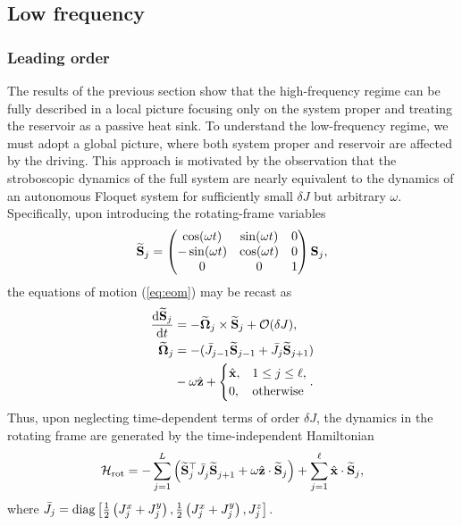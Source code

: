\documentclass[aps,pre,twocolumn,notitlepage,floats,10pt]{revtex4-1}
\def\d{\mathrm{d}}
\def\ptop{{\vphantom\top}}
\newcommand{\be}{\begin{equation}}
\newcommand{\ee}{\end{equation}}
\newcommand{\beA}{\begin{equation}\begin{aligned}}
\newcommand{\eeA}{\end{aligned}\end{equation}}
\begin{document}
\subsection{Low frequency} \label{sec:low-freq}


\subsubsection{Leading order}

The results of the previous section show that the high-frequency regime can be
fully described in a local picture focusing only on the system proper and
treating the reservoir as a passive heat sink.
To understand the low-frequency regime, we must adopt a global picture, where
both system proper and reservoir are affected by the driving.  This approach is
motivated by the observation that the stroboscopic dynamics of the full system
are nearly equivalent to the dynamics of an autonomous Floquet system for
sufficiently small $\delta J$ but arbitrary $\omega$.
Specifically, upon introducing the rotating-frame variables
\be
\widetilde{\bf S}_j = \begin{pmatrix} \cos (\omega t) & \sin (\omega t) & 0 \\ -\sin (\omega t) & \cos (\omega t) & 0 \\ 0 & 0 & 1 \end{pmatrix} {\bf S}_j,
\ee
the equations of motion (\ref{eq:eom}) may be recast as
\beA
\frac{\d \widetilde{\bf S}_j}{\d t} &= -\widetilde{\boldsymbol\Omega}_j \times \widetilde{\bf S}_j + \mathcal{O}(\delta J),\\
\widetilde{\boldsymbol\Omega}_j &= -(\bar{J}_{j-1}\widetilde{\bf S}_{j-1} + \bar{J}_j\widetilde{\bf S}_{j+1})\\
& - \omega \hat{\bf z} + \begin{cases} \hat{\bf x},& 1\leq j \leq \ell,\\ 0,& {\rm otherwise} \end{cases}.
\label{eq:rotdrop}
\eeA
Thus, upon neglecting time-dependent terms of order $\delta J$, the dynamics in
the rotating frame are generated by the time-independent Hamiltonian
\be
\mathcal{H}_{\rm rot} = - \sum_{j=1}^{L} \left( \widetilde{\bf S}_j^\top \bar{J}_j^\ptop \widetilde{\bf S}_{j+1}^\ptop +\omega \hat{\bf z} \cdot \widetilde{\bf S}_j \right) + \sum_{j=1}^\ell \hat{\bf x} \cdot \widetilde{\bf S}_j,
\label{eq:Hrot-L}
\ee
where $\bar{J}_j = {\rm diag}\left[ \frac{1}{2} \left( J_j^x + J_j^y\right),
\frac{1}{2}  \left( J_j^x + J_j^y \right), J_j^z \right]$.
\end{document}
